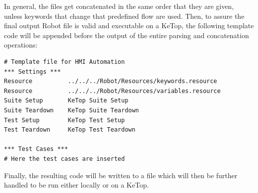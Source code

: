 In general, the files get concatenated in the same order that they are given, unless keywords that change that predefined flow are used. Then, to assure the final output Robot file is valid and executable on a KeTop, the following template code will be appended before the output of the entire parsing and concatenation operations:

\begin{lstlisting}[caption={Output file template appended before inserted test cases.}, label={lst:output_template_example}]
# Template file for HMI Automation
*** Settings ***
Resource          ../../../Robot/Resources/keywords.resource
Resource          ../../../Robot/Resources/variables.resource
Suite Setup       KeTop Suite Setup
Suite Teardown    KeTop Suite Teardown
Test Setup        KeTop Test Setup
Test Teardown     KeTop Test Teardown

*** Test Cases ***
# Here the test cases are inserted
\end{lstlisting}

Finally, the resulting code will be written to a file which will then be further handled to be run either locally or on a KeTop. 
